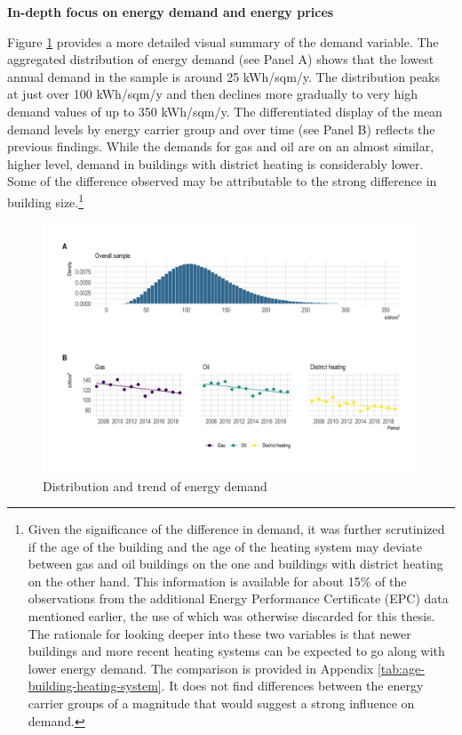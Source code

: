 \documentclass[12pt,twoside]{reedthesis}
\begin{document}
\textbf{In-depth focus on energy demand and energy prices}

Figure \ref{fig:demand-descriptive-graph} provides a more detailed visual summary of the demand variable. The aggregated distribution of energy demand (see Panel A) shows that the lowest annual demand in the sample is around 25 kWh/sqm/y. The distribution peaks at just over 100 kWh/sqm/y and then declines more gradually to very high demand values of up to 350 kWh/sqm/y. The differentiated display of the mean demand levels by energy carrier group and over time (see Panel B) reflects the previous findings. While the demands for gas and oil are on an almost similar, higher level, demand in buildings with district heating is considerably lower. Some of the difference observed may be attributable to the strong difference in building size.\footnote{Given the significance of the difference in demand, it was further scrutinized if the age of the building and the age of the heating system may deviate between gas and oil buildings on the one and buildings with district heating on the other hand. This information is available for about 15\% of the observations from the additional Energy Performance Certificate (EPC) data mentioned earlier, the use of which was otherwise discarded for this thesis. The rationale for looking deeper into these two variables is that newer buildings and more recent heating systems can be expected to go along with lower energy demand. The comparison is provided in Appendix \ref{tab:age-building-heating-system}. It does not find differences between the energy carrier groups of a magnitude that would suggest a strong influence on demand.}
\begin{figure}

{\centering \includegraphics[width=1\linewidth]{figure/demand_descriptive} 

}

\caption{Distribution and trend of energy demand}\label{fig:demand-descriptive-graph}
\end{figure}
\end{document}
